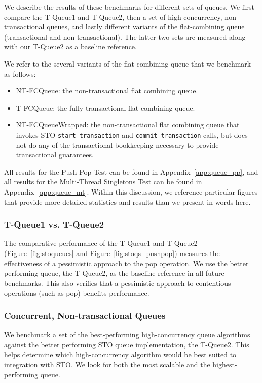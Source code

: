 We describe the results of these benchmarks for different sets of queues. We first compare the T-Queue1 and T-Queue2, then a set of high-concurrency, non-transactional queues, and lastly different variants of the flat-combining queue (transactional and non-transactional). The latter two sets are measured along with our T-Queue2 as a baseline reference.

We refer to the several variants of the flat combining queue that we benchmark as follows:
\begin{itemize}
    \item NT-FCQueue: the non-transactional flat combining queue.
    \item T-FCQueue: the fully-transactional flat-combining queue.
    \item NT-FCQueueWrapped: the non-transactional flat combining queue that invokes STO \texttt{start\_transaction} and \texttt{commit\_transaction} calls, but does not do any of the transactional bookkeeping necessary to provide transactional guarantees.
\end{itemize}

All results for the Push-Pop Test can be found in Appendix~\ref{app:queue_pp}, and all results for the Multi-Thread Singletons Test can be found in Appendix~\ref{app:queue_mt}. Within this discussion, we reference particular figures that provide more detailed statistics and results than we present in words here. 

\subsubsection{T-Queue1 vs. T-Queue2}

The comparative performance of the T-Queue1 and T-Queue2 (Figure~\ref{fig:stoqueues} and Figure~\ref{fig:stoqs_pushpop}) measures the effectiveness of a pessimistic approach to the pop operation. We use the better performing queue, the T-Queue2, as the baseline reference in all future benchmarks. This also verifies that a pessimistic approach to contentious operations (such as pop) benefits performance.

\subsubsection{Concurrent, Non-transactional Queues}

We benchmark a set of the best-performing high-concurrency queue algorithms against the better performing STO queue implementation, the T-Queue2. This helps determine which high-concurrency algorithm would be best suited to integration with STO. We look for both the most scalable and the highest-performing queue.
 
